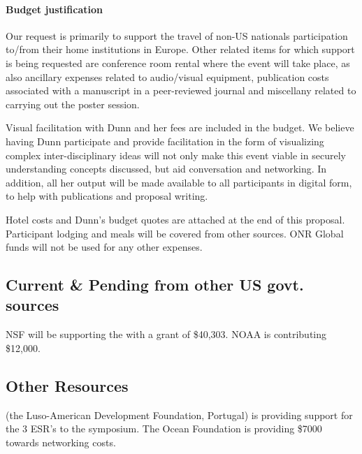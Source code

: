 \paragraph{Budget justification} Our request is primarily to support
the travel of non-US nationals participation to/from their home
institutions in Europe. Other related items for which support is being
requested are conference room rental where the event will take place,
as also ancillary expenses related to audio/visual equipment,
publication costs associated with a manuscript in a peer-reviewed
journal and miscellany related to carrying out the poster session.

Visual facilitation with Dunn and her fees are included in the
budget. We believe having Dunn participate and provide facilitation in
the form of visualizing complex inter-disciplinary ideas will not only
make this event viable in securely understanding concepts discussed,
but aid conversation and networking. In addition, all her output will
be made available to all participants in digital form, to help with
publications and proposal writing.

Hotel costs and Dunn's budget quotes are attached at the end of this
proposal. Participant lodging and meals will be covered from other
sources. ONR Global funds will not be used for any other expenses.

\subsection{Current \& Pending from other US govt. sources}

NSF will be supporting the \symp with a grant of \$40,303. NOAA is
contributing \$12,000.

\subsection{Other Resources}

\fla (the Luso-American Development Foundation, Portugal) is providing
support for the 3 ESR's to the symposium. The Ocean Foundation is
providing \$7000 towards networking costs.
